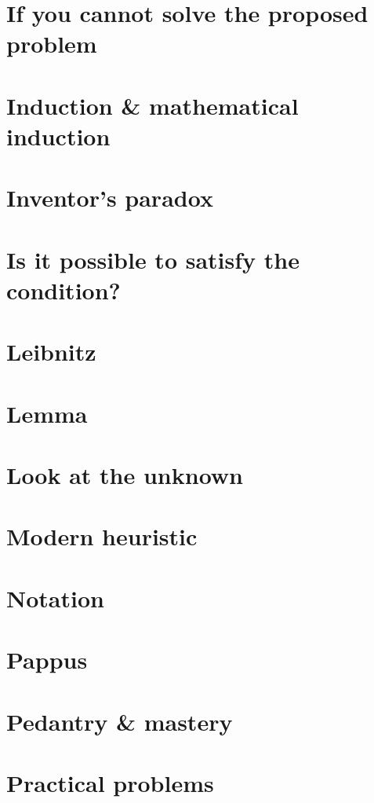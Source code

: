 \documentclass[oneside]{book}
\numberwithin{equation}{section}
\begin{document}
\section{If you cannot solve the proposed problem}

\section{Induction \& mathematical induction}

\section{Inventor's paradox}

\section{Is it possible to satisfy the condition?}

\section{Leibnitz}

\section{Lemma}

\section{Look at the unknown}

\section{Modern heuristic}

\section{Notation}

\section{Pappus}

\section{Pedantry \& mastery}

\section{Practical problems}
\end{document}
